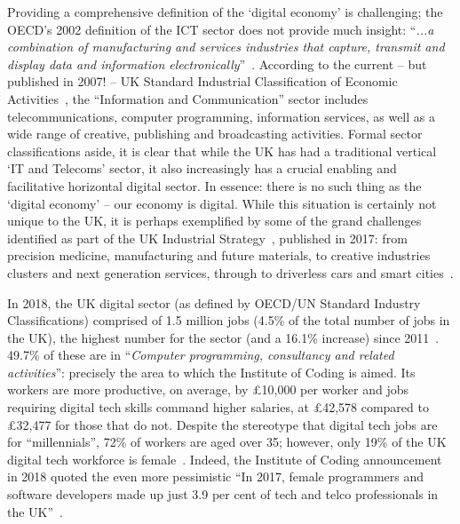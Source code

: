 \documentclass[conference]{IEEEtran}
\begin{document}
Providing a comprehensive definition of the `digital economy' is
challenging; the OECD's 2002 definition of the ICT sector does not
provide much insight: ``{\emph{...a combination of manufacturing and
services industries that capture, transmit and display data and
information electronically}}''~\cite{oecd:2002}.  According to the
current -- but published in 2007! -- UK Standard Industrial
Classification of Economic Activities~\cite{onssic:2009}, the
``Information and Communication'' sector includes telecommunications,
computer programming, information services, as well as a wide range of
creative, publishing and broadcasting activities. Formal sector
classifications aside, it is clear that while the UK has had a
traditional vertical `IT and Telecoms' sector, it also increasingly
has a crucial enabling and facilitative horizontal digital sector. In
essence: there is no such thing as the `digital economy' -- our
economy is digital. While this situation is certainly not unique to
the UK, it is perhaps exemplified by some of the grand challenges
identified as part of the UK Industrial Strategy~\cite{ukis:2017},
published in 2017: from precision medicine, manufacturing and future
materials, to creative industries clusters and next generation
services, through to driverless cars and smart
cities~\cite{tryfonas+crick:petra2018}.


In 2018, the UK digital sector (as defined by OECD/UN Standard
Industry Classifications) comprised of 1.5 million jobs (4.5\% of the
total number of jobs in the UK), the highest number for the sector
(and a 16.1\% increase) since 2011~\cite{dcms:2018}. 49.7\% of these
are in ``{\emph{Computer programming, consultancy and related
activities}}'': precisely the area to which the Institute of Coding is
aimed. Its workers are more productive, on average, by \pounds10,000
per worker and jobs requiring digital tech skills command higher
salaries, at \pounds42,578 compared to \pounds32,477 for those that do
not. Despite the stereotype that digital tech jobs are for
``millennials'', 72\% of workers are aged over 35; however, only 19\%
of the UK digital tech workforce is
female~\cite{technation:2018}. Indeed, the Institute of Coding
announcement in 2018 quoted the even more pessimistic ``In 2017,
female programmers and software developers made up just 3.9 per cent
of tech and telco professionals in the UK''~\cite{DfE2018a}.
\end{document}
